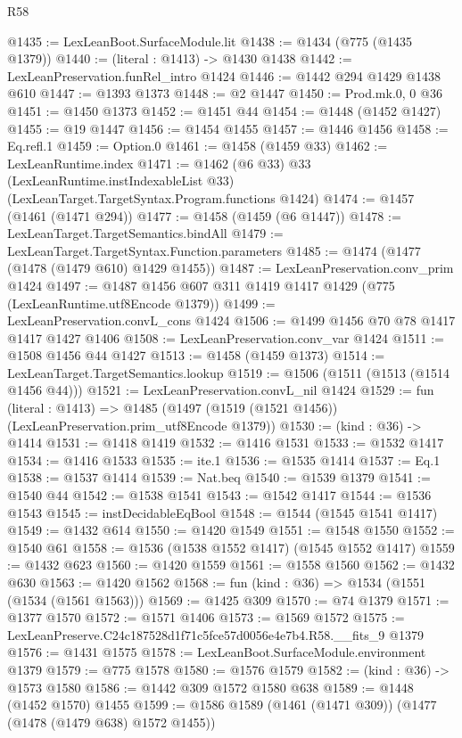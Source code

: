 \begin{lexlean}{R58}
\begin{coremodule}
{{@1435 := LexLeanBoot.SurfaceModule.lit
@1438 := @1434 (@775 (@1435 @1379))
@1440 := (literal : @1413) -> @1430 @1438
@1442 := LexLeanPreservation.funRel_intro @1424
@1446 := @1442 @294 @1429 @1438 @610
@1447 := @1393 @1373
@1448 := @2 @1447
@1450 := Prod.mk.{0, 0} @36
@1451 := @1450 @1373
@1452 := @1451 @44
@1454 := @1448 (@1452 @1427)
@1455 := @19 @1447
@1456 := @1454 @1455
@1457 := @1446 @1456
@1458 := Eq.refl.{1}
@1459 := Option.{0}
@1461 := @1458 (@1459 @33)
@1462 := LexLeanRuntime.index
@1471 := @1462
    (@6 @33)
    @33
    (LexLeanRuntime.instIndexableList @33)
    (LexLeanTarget.TargetSyntax.Program.functions @1424)
@1474 := @1457 (@1461 (@1471 @294))
@1477 := @1458 (@1459 (@6 @1447))
@1478 := LexLeanTarget.TargetSemantics.bindAll
@1479 := LexLeanTarget.TargetSyntax.Function.parameters
@1485 := @1474 (@1477 (@1478 (@1479 @610) @1429 @1455))
@1487 := LexLeanPreservation.conv_prim @1424
@1497 := @1487 @1456 @607 @311 @1419 @1417 @1429 (@775 (LexLeanRuntime.utf8Encode @1379))
@1499 := LexLeanPreservation.convL_cons @1424
@1506 := @1499 @1456 @70 @78 @1417 @1417 @1427 @1406
@1508 := LexLeanPreservation.conv_var @1424
@1511 := @1508 @1456 @44 @1427
@1513 := @1458 (@1459 @1373)
@1514 := LexLeanTarget.TargetSemantics.lookup
@1519 := @1506 (@1511 (@1513 (@1514 @1456 @44)))
@1521 := LexLeanPreservation.convL_nil @1424
@1529 := fun (literal : @1413) =>
  @1485 (@1497 (@1519 (@1521 @1456)) (LexLeanPreservation.prim_utf8Encode @1379))
@1530 := (kind : @36) -> @1414
@1531 := @1418 @1419
@1532 := @1416 @1531
@1533 := @1532 @1417
@1534 := @1416 @1533
@1535 := ite.{1}
@1536 := @1535 @1414
@1537 := Eq.{1}
@1538 := @1537 @1414
@1539 := Nat.beq
@1540 := @1539 @1379
@1541 := @1540 @44
@1542 := @1538 @1541
@1543 := @1542 @1417
@1544 := @1536 @1543
@1545 := instDecidableEqBool
@1548 := @1544 (@1545 @1541 @1417)
@1549 := @1432 @614
@1550 := @1420 @1549
@1551 := @1548 @1550
@1552 := @1540 @61
@1558 := @1536 (@1538 @1552 @1417) (@1545 @1552 @1417)
@1559 := @1432 @623
@1560 := @1420 @1559
@1561 := @1558 @1560
@1562 := @1432 @630
@1563 := @1420 @1562
@1568 := fun (kind : @36) => @1534 (@1551 (@1534 (@1561 @1563)))
@1569 := @1425 @309
@1570 := @74 @1379
@1571 := @1377 @1570
@1572 := @1571 @1406
@1573 := @1569 @1572
@1575 := LexLeanPreserve.C24c187528d1f71c5fce57d0056e4e7b4.R58.__fits_9 @1379
@1576 := @1431 @1575
@1578 := LexLeanBoot.SurfaceModule.environment @1379
@1579 := @775 @1578
@1580 := @1576 @1579
@1582 := (kind : @36) -> @1573 @1580
@1586 := @1442 @309 @1572 @1580 @638
@1589 := @1448 (@1452 @1570) @1455
@1599 := @1586 @1589 (@1461 (@1471 @309)) (@1477 (@1478 (@1479 @638) @1572 @1455))
}}
\end{coremodule}
\end{lexlean}
